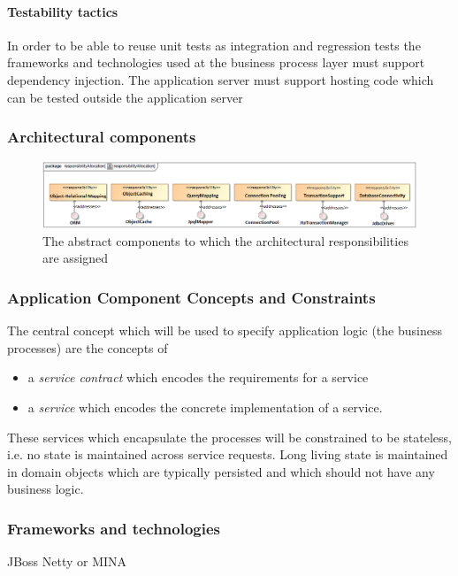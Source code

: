 \documentclass[a4paper,12pt]{report}
\begin{document}
\paragraph {Testability tactics }
In order to be able to reuse unit tests as integration and regression tests the frameworks and technologies used at the business process layer must support dependency injection. The application server must support hosting code which can be tested outside the application server

\subsubsection {Architectural components}
	\begin{figure}[htb]
		\centering
		\includegraphics [scale=0.5]{../Diagrams/PersistanceResponsibiltiesAllocationZ.png}
		\caption{The abstract components to which the architectural responsibilities are assigned}
	\end{figure}

\subsubsection {Application Component Concepts and Constraints}
The central concept which will be used to specify application logic (the business processes) are the
concepts of
	\begin {itemize}
		\item a \textit{service contract} which encodes the requirements for a service
		\item a \textit{service} which encodes the concrete implementation of a service. 
	\end {itemize}
These services which encapsulate the processes will be constrained to be stateless, i.e. no state
is maintained across service requests.
Long living state is maintained in domain objects which are typically persisted and which should
not have any business logic.



\subsubsection {Frameworks and technologies}
JBoss
Netty or MINA
\end{document}
